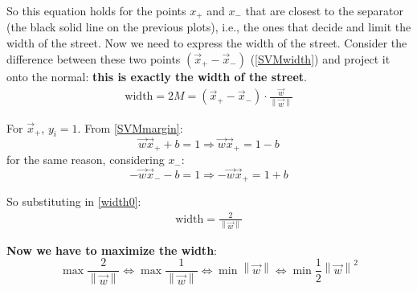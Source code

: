 \documentclass[12pt, letterpaper]{article}
\theoremstyle{definition}
\newcommand\norm[1]{\left\lVert#1\right\rVert}
\let\tb\textbf
\begin{document}
So this equation holds for the points $x_+$ and $x_-$ that are closest to the separator (the black solid line on the previous plots), i.e., the ones that decide and limit the width of the street. Now we need to express the width of the street. Consider the difference between these two points $(\vec{x}_+ - \vec{x}_-)$ (\autoref{SVMwidth}) and project it onto the normal: \textbf{this is exactly the width of the street}.
\begin{equation}
\begin{aligned}
\text{width} = 2M = \left( \vec{x}_+ - \vec{x}_-\right) \cdot \frac{\vec{w}}{\norm{\vec{w}}}
\end{aligned}
\label{width0}
\end{equation}

For $\vec{x}_+$, $y_i=1$. From \autoref{SVMmargin}:
\begin{equation}
\vec{w} \vec{x}_+ + b = 1\Rightarrow \vec{w} \vec{x}_+ = 1-b
\end{equation}
for the same reason, considering $x_-$:
\begin{equation}
-\vec{w} \vec{x}_- - b = 1\Rightarrow -\vec{w} \vec{x}_+ = 1+b
\end{equation}

So substituting in \autoref{width0}:
\begin{equation}
\begin{aligned}
\text{width} = \frac{2}{\norm{\vec{w}}}
\end{aligned}
\label{width1}
\end{equation}

\tb{Now we have to maximize the width}:
\begin{equation}
\max \frac{2}{\norm{\vec{w}}} \Leftrightarrow \max \frac{1}{\norm{\vec{w}}} \Leftrightarrow\min \norm{\vec{w}} \Leftrightarrow \min \frac{1}{2} \norm{\vec{w}}^2
\label{SVMmin}
\end{equation}
\end{document}
